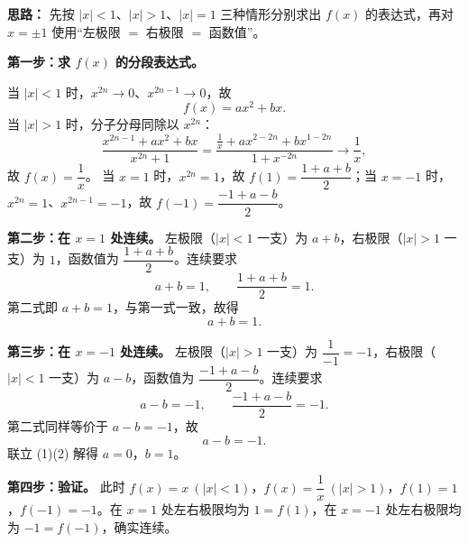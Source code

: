 \ifshowsolutions%
\textbf{思路：} 先按 $|x|<1$、$|x|>1$、$|x|=1$ 三种情形分别求出 $f(x)$ 的表达式，再对 $x=\pm1$ 使用“左极限 $=$ 右极限 $=$ 函数值”。

\textbf{第一步：求 $f(x)$ 的分段表达式。}

当 $|x|<1$ 时，$x^{2n}\to0$、$x^{2n-1}\to0$，故
\[
f(x)=ax^2+bx .
\]
当 $|x|>1$ 时，分子分母同除以 $x^{2n}$：
\[
\frac{x^{2n-1}+ax^2+bx}{x^{2n}+1}
=\frac{\frac1x+ax^{2-2n}+bx^{1-2n}}{1+x^{-2n}}\longrightarrow\frac1x ,
\]
故 $f(x)=\dfrac1x$。
当 $x=1$ 时，$x^{2n}=1$，故 $f(1)=\dfrac{1+a+b}{2}$；当 $x=-1$ 时，$x^{2n}=1$、$x^{2n-1}=-1$，故 $f(-1)=\dfrac{-1+a-b}{2}$。

\textbf{第二步：在 $x=1$ 处连续。} 左极限（$|x|<1$ 一支）为 $a+b$，右极限（$|x|>1$ 一支）为 $1$，函数值为 $\dfrac{1+a+b}{2}$。连续要求
\[
a+b=1,\qquad \frac{1+a+b}{2}=1 .
\]
第二式即 $a+b=1$，与第一式一致，故得
\[
a+b=1. \tag{1}
\]

\textbf{第三步：在 $x=-1$ 处连续。} 左极限（$|x|>1$ 一支）为 $\dfrac{1}{-1}=-1$，右极限（$|x|<1$ 一支）为 $a-b$，函数值为 $\dfrac{-1+a-b}{2}$。连续要求
\[
a-b=-1,\qquad \frac{-1+a-b}{2}=-1 .
\]
第二式同样等价于 $a-b=-1$，故
\[
a-b=-1. \tag{2}
\]
联立 (1)(2) 解得 $a=0$，$b=1$。

\textbf{第四步：验证。} 此时 $f(x)=x\ (|x|<1)$，$f(x)=\dfrac1x\ (|x|>1)$，$f(1)=1$，$f(-1)=-1$。在 $x=1$ 处左右极限均为 $1=f(1)$，在 $x=-1$ 处左右极限均为 $-1=f(-1)$，确实连续。


\else \answerarea[12] \fi%
